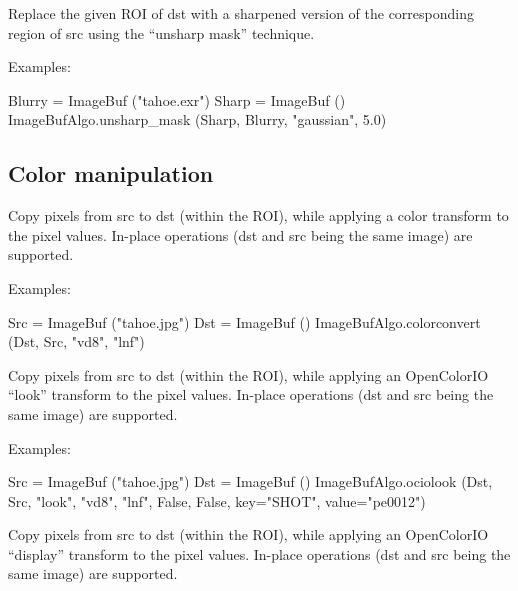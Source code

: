 Replace the given ROI of {\cf dst} with a sharpened version of the
corresponding region of {\cf src} using the ``unsharp mask'' technique.

\smallskip
\noindent Examples:
\begin{code}
    Blurry = ImageBuf ("tahoe.exr")
    Sharp = ImageBuf ()
    ImageBufAlgo.unsharp_mask (Sharp, Blurry, "gaussian", 5.0)
\end{code}
\apiend



\subsection{Color manipulation}
\label{sec:iba:py:color}

 
Copy pixels from {\cf src} to {\cf dst} (within the ROI), while
applying a color transform to the pixel values.
In-place operations ({\cf dst} and {\cf src} being the same image)
are supported.

\smallskip
\noindent Examples:
\begin{code}
    Src = ImageBuf ("tahoe.jpg")
    Dst = ImageBuf ()
    ImageBufAlgo.colorconvert (Dst, Src, "vd8", "lnf")
\end{code}
\apiend


 
Copy pixels from {\cf src} to {\cf dst} (within the ROI), while
applying an OpenColorIO ``look'' transform to the pixel values.
In-place operations ({\cf dst} and {\cf src} being the same image)
are supported.

\smallskip
\noindent Examples:
\begin{code}
    Src = ImageBuf ("tahoe.jpg")
    Dst = ImageBuf ()
    ImageBufAlgo.ociolook (Dst, Src, "look", "vd8", "lnf", False, False,
                            key="SHOT", value="pe0012")
\end{code}
\apiend


 
Copy pixels from {\cf src} to {\cf dst} (within the ROI), while
applying an OpenColorIO ``display'' transform to the pixel values.
In-place operations ({\cf dst} and {\cf src} being the same image)
are supported.

